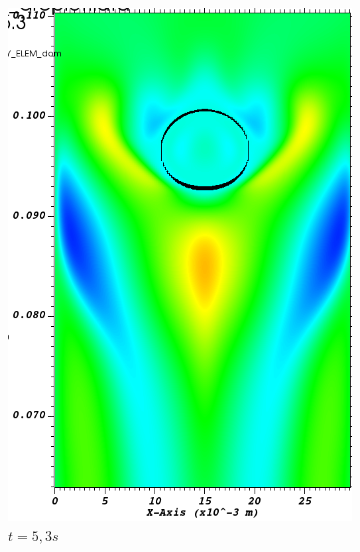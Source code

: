 \begin{figure}[H]
\begin{subfigure}[ht!]{0.23\textwidth}
		\includegraphics[width=1\textwidth]{fig_plateau_vitesse/visit0013.png}
		\caption{$t=5,3s$}
		\label{fig:three sin x}
	\end{subfigure}
	\begin{subfigure}[ht!]{0.23\textwidth}
		\centering

\end{subfigure}
\end{figure}
